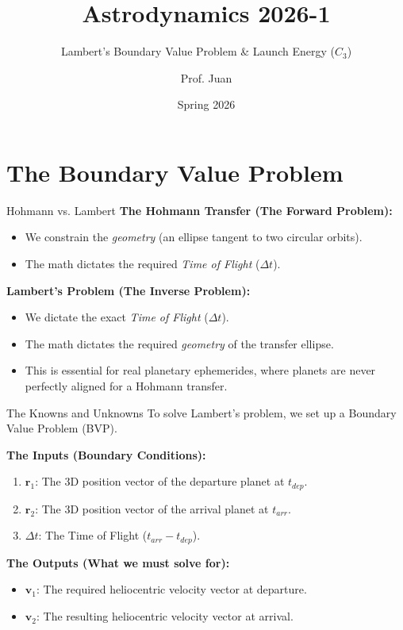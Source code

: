 \documentclass[11pt]{beamer}
\title[Lambert's Problem]{Astrodynamics 2026-1}
\subtitle{Lambert's Boundary Value Problem \& Launch Energy ($C_3$)}
\author{Prof. Juan}
\institute{Universidad de Antioquia - Aerospace Engineering}
\date{Spring 2026}
\begin{document}
\begin{frame}
    \titlepage
\end{frame}

\section{The Boundary Value Problem}

\begin{frame}{Hohmann vs. Lambert}
    \textbf{The Hohmann Transfer (The Forward Problem):}
    \begin{itemize}
        \item We constrain the \textit{geometry} (an ellipse tangent to two circular orbits).
        \item The math dictates the required \textit{Time of Flight} ($\Delta t$).
    \end{itemize}
    
    \vspace{0.3cm}
    \textbf{Lambert's Problem (The Inverse Problem):}
    \begin{itemize}
        \item We dictate the exact \textit{Time of Flight} ($\Delta t$).
        \item The math dictates the required \textit{geometry} of the transfer ellipse.
        \item This is essential for real planetary ephemerides, where planets are never perfectly aligned for a Hohmann transfer.
    \end{itemize}
\end{frame}

\begin{frame}{The Knowns and Unknowns}
    To solve Lambert's problem, we set up a Boundary Value Problem (BVP).
    
    \vspace{0.3cm}
    \textbf{The Inputs (Boundary Conditions):}
    \begin{enumerate}
        \item $\bm{r}_1$: The 3D position vector of the departure planet at $t_{dep}$.
        \item $\bm{r}_2$: The 3D position vector of the arrival planet at $t_{arr}$.
        \item $\Delta t$: The Time of Flight ($t_{arr} - t_{dep}$).
    \end{enumerate}
    
    \vspace{0.3cm}
    \textbf{The Outputs (What we must solve for):}
    \begin{itemize}
        \item $\bm{v}_1$: The required heliocentric velocity vector at departure.
        \item $\bm{v}_2$: The resulting heliocentric velocity vector at arrival.
    \end{itemize}
\end{frame}
\end{document}
